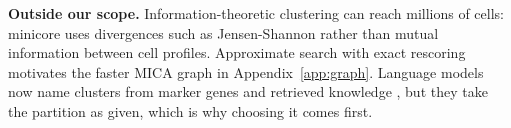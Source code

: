 \textbf{Outside our scope.} Information-theoretic clustering can reach millions of cells: minicore
\cite{baker2021minicore} uses divergences such as Jensen-Shannon rather than mutual information between
cell profiles. Approximate search with exact rescoring \cite{malkov2020efficient,douze2024faiss}
motivates the faster MICA graph in Appendix~\ref{app:graph}. Language models now name clusters from
marker genes and retrieved knowledge \cite{hou2024gpt4,crowley2025anndictionary,xie2025cassia}, but they
take the partition as given, which is why choosing it comes first.
